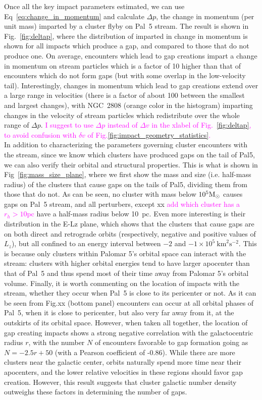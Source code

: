 \documentclass[draft]{aa}
\newcommand{\paola}[1]{\textcolor{magenta}{{#1}}}
\begin{document}
      
  Once all the key impact parameters estimated, we can use Eq~\ref{eq:change_in_momentum} and calculate $\Delta p$, the change in momentum (per unit mass) imparted by a cluster flyby on Pal~5 stream. The result  is shown in Fig.~\ref{fig:deltap}, where the distribution of imparted in change in momentum is shown for all impacts which produce a gap, and compared to those that do not produce one. On average, encounters which lead to gap creations impart a change in momentum on stream particles which is a factor of 10 higher than that of encounters which do not form gaps (but with some overlap in the low-velocity tail). Interestingly, changes in momentum which lead to gap creations extend over a large range in velocities (there is a factor of about 100 between the smallest and largest changes), with NGC~2808 (orange color in the histogram) imparting changes in the velocity of stream particles which redistribute over the whole range of $\Delta p$. \paola{I suggest to use $\Delta p$ instead of $\Delta v$ in the xlabel of Fig.~\ref{fig:deltap}, to avoid confusion with $\delta v$ of Fig.\ref{fig:impact_geometry_statistics}.}\\

  In addition to characterizing the parameters governing cluster encounters with the stream, since we know which clusters have produced gaps on the tail of Pal5, we can also verify their orbital and structural properties.  This is what is shown in Fig~\ref{fig:mass_size_plane}, where we first show the mass and size (i.e. half-mass radius) of the clusters that cause gaps on the tails of Pal5, dividing them from those that do not. As can be seen, no cluster with mass below $10^5 \rm{M}_\odot$ causes gaps on Pal~5 stream, and all perturbers, except xx \paola{add which cluster has a $r_h > 10$pc} have a  half-mass radius below 10~pc. Even more interesting is their distribution in the E-Lz plane, which shows that the clusters that cause gaps are on both direct and retrograde orbits (respectively, negative and positive values of $L_z$), but all confined to an energy interval between $-2$ and $-1 \times10^5~\textrm{km}^2\textrm{s}^{-2}$. This is because only clusters within Palomar 5's orbital space can interact with the stream: clusters with higher orbital energies tend to have larger apocenter than that of Pal~5 and thus spend most of their time away from Palomar 5's orbital volume. Finally,  it is worth commenting on the location of impacts with the stream, whether they occur when Pal~5 is close to its pericenter or not. As it can be seen from Fig.xx (bottom panel) encounters can occur at all orbital phases of Pal~5, when it is close to pericenter, but also very far away from it, at the outskirts of its orbital space. However, when taken all together, the location of gap creating impacts shows a strong negative correlation  with the galactocentric radius $r$, with the number $N$ of encounters favorable to gap formation  going as $N = -2.5r + 50$ (with a Pearson coefficient of -0.86). While there are more clusters near the galactic center, orbits naturally spend more time near their apocenters, and the lower relative velocities in these regions should favor gap creation. However, this result suggests that cluster galactic number density outweighs these factors in determining the number of gaps.
\end{document}
